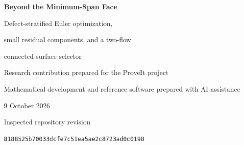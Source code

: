 \documentclass[11pt,letterpaper]{article}
\theoremstyle{definition}
\newcommand{\poly}{\operatorname{poly}}
\newcommand{\snap}{8188525b70033dcfe7c51ea5ae2c8723ad0c0198}
\begin{document}
\begin{titlepage}
\vspace*{10mm}
\begin{center}
{\LARGE\bfseries Beyond the Minimum-Span Face\par}
\vspace{5mm}
{\Large Defect-stratified Euler optimization,\par
small residual components, and a two-flow\par
connected-surface selector\par}
\vspace{9mm}
{\large Research contribution prepared for the ProveIt project\par}
\vspace{2mm}
{Mathematical development and reference software prepared with AI assistance\par}
\vspace{5mm}
{9 October 2026\par}
\vspace{4mm}
{\small Inspected repository revision\par\texttt{\snap}\par}
\end{center}
\vspace{7mm}
\begin{abstract}
The maintained cocycle branch optimizes Euler characteristic on the entire minimum-piece face. We extend that exact query to every integral coherent surface with at most $k$ additional normal pieces. A balanced minimum-span witness expresses the excess as a sum of $2T$ nonnegative integral extremal defects. Specifying the positive defects and one realizing corner for each gives a complete cover by
\[
 H(T,k)=\sum_{j=0}^{\min(2T,k)}\binom{2T}{j}3^j\binom{k}{j}
\]
difference-constraint systems. Each has constant span and an integral, polynomial-time Euler optimizer. Consequently the complete bounded-excess Euler profile is computable in $H(T,k)\poly(T,B,\log(k+1))$ bit time. For polynomial input size and $k=O(\log n)$ this is $n^{O(\log n)}$.

A topological deletion theorem shows that all components except any chosen positive primitive core contain at most $k$ pieces altogether. Oppositely oriented primitive components cost at least twice the minimum primitive span per pair; a product solid-torus family attains that bound.

We also reverse the optimization order. Two polynomial-size network solves minimize the Euler edge penalty $F$ and then span over all $F$-minimizers. In a primitive class of a knot exterior the selected surface is connected. The test $F_*\leq2D_*$ is sufficient for an unknot certificate, and a coherent disc of span at most $D_*+1$ guarantees this test succeeds.


\end{abstract}
\end{titlepage}
\end{document}
